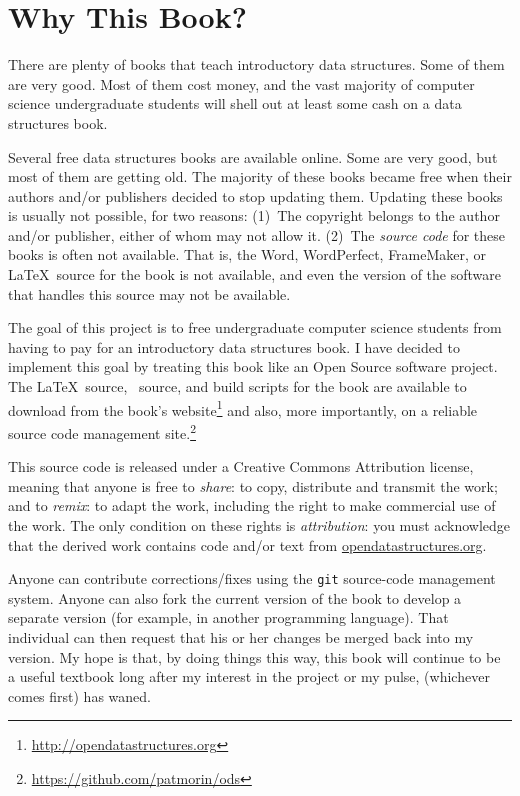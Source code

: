 \chapter*{Why This Book?}

There are plenty of books that teach introductory data structures.
Some of them are very good.  Most of them cost money, and the vast
majority of computer science undergraduate students will shell out at
least some cash on a data structures book.

Several free data structures books are available online.  Some are very
good, but most of them are getting old.  The majority of these books
became free when their authors and/or publishers decided to stop updating
them.  Updating these books is usually not possible, for two reasons:
(1)~The copyright belongs to the author and/or publisher, either of whom
may not allow it.  (2)~The \emph{source code} for these books is often
not available.  That is, the Word, WordPerfect, FrameMaker, or \LaTeX\
source for the book is not available, and even the version of the software
that handles this source may not be available.

The goal of this project is to free undergraduate computer science
students from having to pay for an introductory data structures book.
I have decided to implement this goal by treating this book like an
Open Source
software project.  The \LaTeX\ source, \lang\ source, and
build scripts for the book are available to download from the
book's website\footnote{\url{http://opendatastructures.org}}
and also, more importantly, on a reliable source code management
site.\footnote{\url{https://github.com/patmorin/ods}}

This source code is released under a Creative Commons Attribution license,
meaning that anyone is free to \emph{share}:
to copy, distribute and
transmit the work; and to \emph{remix}:
to adapt the work, including the
right to make commercial use of the work.  The only condition on these
rights is \emph{attribution}: you must acknowledge that the derived work
contains code and/or text from \url{opendatastructures.org}.

Anyone can contribute corrections/fixes using the \texttt{git}
source-code
management system.  Anyone can also fork the current version of the
book to develop a separate version (for example, in another programming
language).  That individual can then request that his or her changes be
merged back into my version.  My hope is that, by doing things this way,
this book will continue to be a useful textbook long after my interest
in the project or my pulse, (whichever comes first) has waned.


